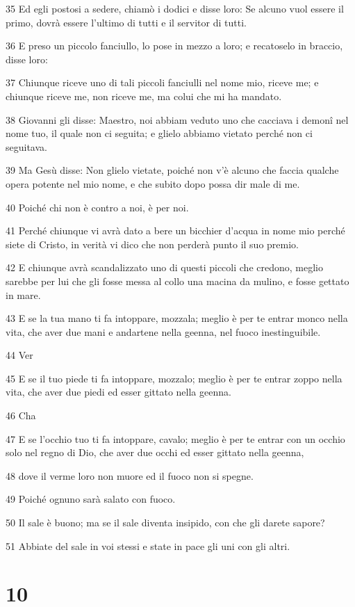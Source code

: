 \par 35 Ed egli postosi a sedere, chiamò i dodici e disse loro: Se alcuno vuol essere il primo, dovrà essere l'ultimo di tutti e il servitor di tutti.
\par 36 E preso un piccolo fanciullo, lo pose in mezzo a loro; e recatoselo in braccio, disse loro:
\par 37 Chiunque riceve uno di tali piccoli fanciulli nel nome mio, riceve me; e chiunque riceve me, non riceve me, ma colui che mi ha mandato.
\par 38 Giovanni gli disse: Maestro, noi abbiam veduto uno che cacciava i demonî nel nome tuo, il quale non ci seguita; e glielo abbiamo vietato perché non ci seguitava.
\par 39 Ma Gesù disse: Non glielo vietate, poiché non v'è alcuno che faccia qualche opera potente nel mio nome, e che subito dopo possa dir male di me.
\par 40 Poiché chi non è contro a noi, è per noi.
\par 41 Perché chiunque vi avrà dato a bere un bicchier d'acqua in nome mio perché siete di Cristo, in verità vi dico che non perderà punto il suo premio.
\par 42 E chiunque avrà scandalizzato uno di questi piccoli che credono, meglio sarebbe per lui che gli fosse messa al collo una macina da mulino, e fosse gettato in mare.
\par 43 E se la tua mano ti fa intoppare, mozzala; meglio è per te entrar monco nella vita, che aver due mani e andartene nella geenna, nel fuoco inestinguibile.
\par 44 Ver
\par 45 E se il tuo piede ti fa intoppare, mozzalo; meglio è per te entrar zoppo nella vita, che aver due piedi ed esser gittato nella geenna.
\par 46 Cha
\par 47 E se l'occhio tuo ti fa intoppare, cavalo; meglio è per te entrar con un occhio solo nel regno di Dio, che aver due occhi ed esser gittato nella geenna,
\par 48 dove il verme loro non muore ed il fuoco non si spegne.
\par 49 Poiché ognuno sarà salato con fuoco.
\par 50 Il sale è buono; ma se il sale diventa insipido, con che gli darete sapore?
\par 51 Abbiate del sale in voi stessi e state in pace gli uni con gli altri.

\chapter{10}

